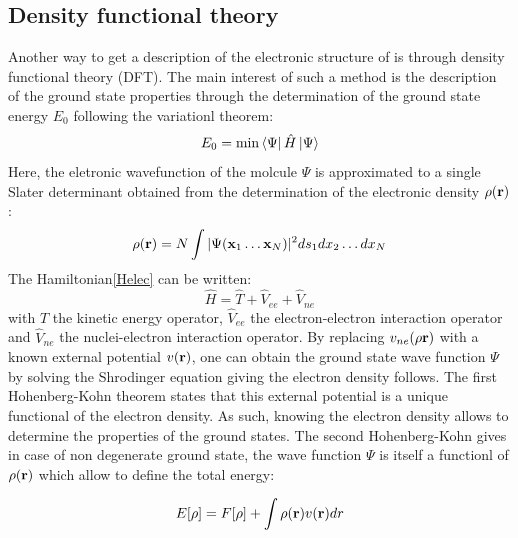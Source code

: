\documentclass[10pt]{report}
\numberwithin{equation}{section}
\begin{document}
\subsection{Density functional theory}

Another way to get a description of the electronic structure of is through density functional theory (DFT).
The main interest of such a method is the description of the ground state properties through the determination of the ground state energy $E_0$ following the variationl theorem:
\begin{equation}
    E_0 = \min \bra{\Psi} \hat{H} \ket{\Psi}
\end{equation}
Here, the eletronic wavefunction of the molcule $\Psi$ is approximated to a single Slater determinant obtained from the determination of the electronic density $\rho(\vb r)$:
\begin{equation}
    \rho(\vb r)=N\int |\Psi(\vb x_1 \ldots \vb x_N)|^2 ds_1 dx_2 \ldots dx_N
\end{equation}
The Hamiltonian\ref{Helec} can be written:
\begin{equation}\label{Hop}
    \hat{H}=\hat{T} + \hat{V}_{ee} + \hat{V}_{ne}
\end{equation} 
with $\hat{T}$ the kinetic energy operator, $\hat{V}_{ee}$ the electron-electron interaction operator and $\hat{V}_{ne}$ the nuclei-electron interaction operator. 
By replacing $v_{ne}(\rho\vb r)$ with a known external potential $v(\vb r)$, one can obtain the ground state wave function $\Psi$ by solving the Shrodinger equation giving the electron density follows.
The first Hohenberg-Kohn theorem states that this external potential is a unique functional of the electron density.
As such, knowing the electron density allows to determine the properties of the ground states.
The second Hohenberg-Kohn gives in case of non degenerate ground state, the wave function $\Psi$ is itself a functionl of $\rho(\vb r)$ which allow to define the total energy:

\begin{equation}\label{EnergyDFT}
    E[\rho]= F[\rho]+ \int \rho(\vb r) v(\vb r)dr
\end{equation}
\end{document}
